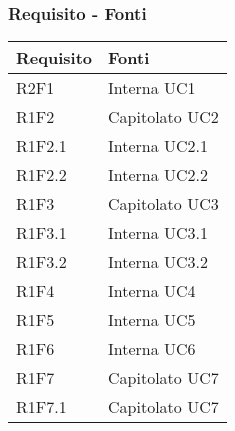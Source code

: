 \subsubsection{Requisito - Fonti}
\begin{center}
	\begin{longtable}{|p{22mm}|p{22mm}|}
		\hline
		\rowcolor{lighter-grayer}
		\textbf{Requisito} &  \textbf{Fonti}  \\
		\hline
		\endhead
		




R2F1 &
Interna \newline
UC1 \newline
\\
\hline
R1F2 &
Capitolato \newline
UC2 \newline
\\
\hline
R1F2.1 &
Interna \newline
UC2.1 \newline
\\
\hline
R1F2.2 &
Interna \newline
UC2.2 \newline
\\
\hline
R1F3 &
Capitolato \newline
UC3 \newline
\\
\hline
R1F3.1 &
Interna \newline
UC3.1 \newline
\\
\hline
R1F3.2 &
Interna \newline
UC3.2 \newline
\\
\hline
R1F4 &
Interna \newline
UC4 \newline
\\
\hline
R1F5 &
Interna \newline
UC5 \newline
\\
\hline
R1F6 &
Interna \newline
UC6 \newline
\\
\hline
R1F7 &
Capitolato \newline
UC7 \newline
\\
\hline
R1F7.1 &
Capitolato \newline
UC7 \newline

\end{longtable}
\end{center}

